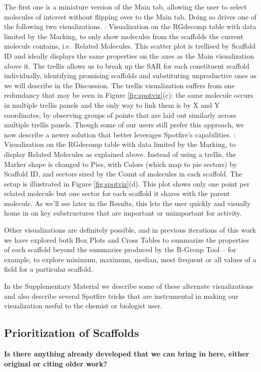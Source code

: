 \documentclass[journal=jacsat,manuscript=article]{achemso}
\newcommand*\fref[1]{Figure \ref{fig:#1}}
\newcommand*\ie{i.e.~}
\begin{document}
\begin{itemize}
\subitem The first one is a miniature version of the Main tab, allowing the user to select molecules of interest without flipping over to the Main tab. Doing so drives one of the following two visualizations.
: Visualization on the {RG}decomp table with data limited by the Marking, to only show molecules from the scaffolds the current molecule contains, \ie Related Molecules.  This scatter plot is trellised by Scaffold ID and ideally displays the same properties on the axes as the Main visualization above it.  The trellis allows us to break up the SAR for each constituent scaffold individually, identifying promising scaffolds and substituting unproductive ones as we will describe in the Discussion. The trellis visualization suffers from one redundancy that may be seen in \fref{spotviz}(c): the same molecule occurs in multiple trellis panels and the only way to link them is by X and Y coordinates, by observing groups of points that are laid out similarly across multiple trellis panels.  Though some of our users still prefer this approach, we now describe a newer solution that better leverages Spotfire's capabilities. 
: Visualization on the {RG}decomp table with data limited by the Marking, to display Related Molecules as explained above. Instead of using a trellis, the Marker shape is changed to Pies, with Colors (which map to pie sectors) by Scaffold ID, and sectors sized by the Count of molecules in each scaffold.  The setup is illustrated in \fref{spotviz}(d). This plot shows only one point per related molecule but one sector for each scaffold it shares with the parent molecule.  As we'll see later in the Results, this lets the user quickly and visually home in on key substructures that are important or unimportant for activity. 
\end{itemize}

Other visualizations are definitely possible, and in previous iterations of this work we have explored both Box Plots and Cross Tables to summarize the properties of each scaffold beyond the summaries produced by the R-Group Tool -- for example, to explore minimum, maximum, median, most frequent or all values of a field for a particular scaffold.  

In the Supplementary Material we describe some of these alternate visualizations and also describe several Spotfire tricks that are instrumental in making our visualization useful to the chemist or biologist user. 

\subsection{Prioritization of Scaffolds} 
\textbf{Is there anything already developed that we can bring in here, either original or citing older work?}
\end{document}
